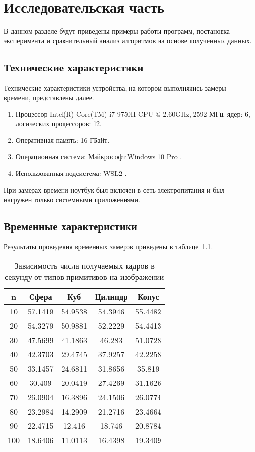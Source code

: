 \chapter{Исследовательская часть}


В данном разделе будут приведены примеры работы программ, постановка эксперимента и сравнительный анализ алгоритмов на основе полученных данных.


\section{Технические характеристики}

Технические характеристики устройства, на котором выполнялись замеры времени, представлены далее.

\begin{enumerate}
	\item Процессор	Intel(R) Core(TM) i7-9750H CPU @ 2.60GHz, 2592 МГц, ядер: 6, логических процессоров: 12.
	\item Оперативная память: 16 ГБайт.
	\item Операционная система: Майкрософт Windows 10 Pro \cite{windows}.
	\item Использованная подсистема: WSL2 \cite{WSL2}.
\end{enumerate}

При замерах времени ноутбук был включен в сеть электропитания и был нагружен только системными приложениями.

\section{Временные характеристики}
Результаты проведения временных замеров приведены в таблице~\ref{t:timings}.


\begin{table}[ht]
	\centering
	\caption{Зависимость числа получаемых кадров в секунду от типов примитивов на изображении}
	\begin{tabular}{|c|c|c|c|c|}
		\hline
		n   & Сфера   & Куб     & Цилиндр & Конус   \\ \hline
		10  & 57.1419 & 54.9538 & 54.3946 & 55.4482 \\ \hline
		20  & 54.3279 & 50.9881 & 52.2229 & 54.4413 \\ \hline
		30  & 47.5699 & 41.1863 & 46.283  & 51.0728 \\ \hline
		40  & 42.3703 & 29.4745 & 37.9257 & 42.2258 \\ \hline
		50  & 33.1457 & 24.6811 & 31.8656 & 35.819  \\ \hline
		60  & 30.409  & 20.0419 & 27.4269 & 31.1626 \\ \hline
		70  & 26.0904 & 16.3896 & 24.1506 & 26.0774 \\ \hline
		80  & 23.2984 & 14.2909 & 21.2716 & 23.4664 \\ \hline
		90  & 22.4715 & 12.416  & 18.746  & 20.8784 \\ \hline
		100 & 18.6406 & 11.0113 & 16.4398 & 19.3409 \\ \hline
	\end{tabular}
	\label{t:timings}
\end{table}

